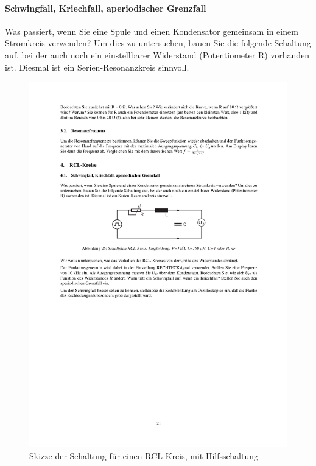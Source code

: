 \documentclass[12pt]{scrartcl}
\begin{document}
\paragraph{Schwingfall, Kriechfall, aperiodischer Grenzfall}
Was passiert, wenn Sie eine Spule und einen Kondensator gemeinsam in einem Stromkreis verwenden? Um dies zu untersuchen, bauen Sie die folgende Schaltung auf, bei der auch noch ein einstellbarer Widerstand (Potentiometer R) vorhanden ist. Diesmal ist ein Serien-Resonanzkreis sinnvoll.
\begin{figure}[htbp] 
  \centering
    \includegraphics[trim = 20mm 165mm 1mm 95mm, clip, scale = 1]{RCL_kreis.pdf}
  	\caption[Skizze der Schaltung für einen RCL-Kreis, mit Hilfsschaltung]{Skizze der Schaltung für einen RCL-Kreis, mit Hilfsschaltung\footnotemark}
  \label{fig:LC-Kreis_hilfe}
\end{figure}
\end{document}
